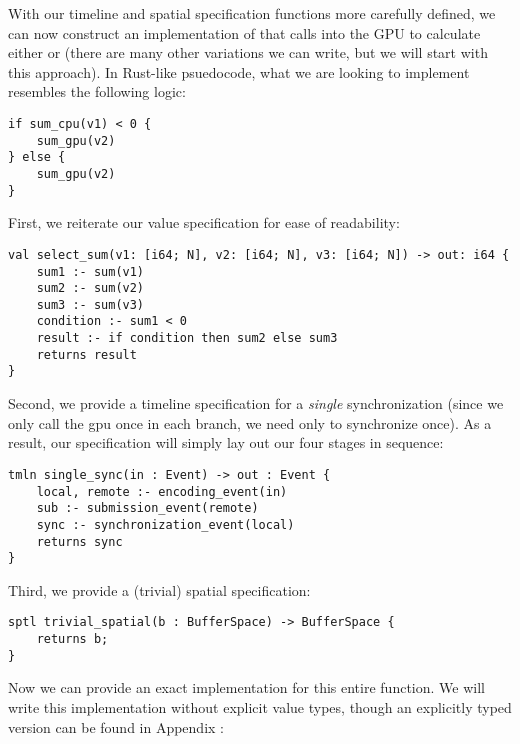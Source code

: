With our timeline and spatial specification functions more carefully defined, we can now construct an implementation of  that calls into the GPU to calculate either  or  (there are many other variations we can write, but we will start with this approach).  In Rust-like psuedocode, what we are looking to implement resembles the following logic:
%
\begin{lstlisting}
if sum_cpu(v1) < 0 {
    sum_gpu(v2)
} else {
    sum_gpu(v2)
}
\end{lstlisting}
%
First, we reiterate our value specification for ease of readability:
%
\begin{lstlisting}
val select_sum(v1: [i64; N], v2: [i64; N], v3: [i64; N]) -> out: i64 {
    sum1 :- sum(v1)
    sum2 :- sum(v2)
    sum3 :- sum(v3)
    condition :- sum1 < 0
    result :- if condition then sum2 else sum3
    returns result
}
\end{lstlisting}
%
Second, we provide a timeline specification for a \emph{single} synchronization (since we only call the gpu once in each branch, we need only to synchronize once).  As a result, our specification will simply lay out our four stages in sequence:
%
\begin{lstlisting}
tmln single_sync(in : Event) -> out : Event {
    local, remote :- encoding_event(in)
    sub :- submission_event(remote)
    sync :- synchronization_event(local)
    returns sync
}
\end{lstlisting}
%
Third, we provide a (trivial) spatial specification:
%
\begin{lstlisting}
sptl trivial_spatial(b : BufferSpace) -> BufferSpace {
    returns b;
}
\end{lstlisting}
%
Now we can provide an exact implementation for this entire function.  We will write this implementation without explicit value types, though an explicitly typed version can be found in Appendix :
%
